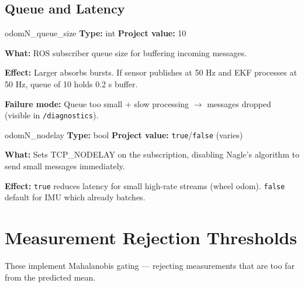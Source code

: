 \documentclass[11pt,a4paper]{article}
\begin{document}
\subsection{Queue and Latency}

\begin{paramcard}{odomN\_queue\_size}
\textbf{Type:} int \quad \textbf{Project value:} 10

\textbf{What:} ROS subscriber queue size for buffering incoming messages.

\textbf{Effect:} Larger absorbs bursts. If sensor publishes at 50 Hz and EKF processes at 50 Hz, queue of 10 holds 0.2 s buffer.

\textbf{Failure mode:} Queue too small + slow processing $\to$ messages dropped (visible in \texttt{/diagnostics}).
\end{paramcard}

\begin{paramcard}{odomN\_nodelay}
\textbf{Type:} bool \quad \textbf{Project value:} \texttt{true}/\texttt{false} (varies)

\textbf{What:} Sets TCP\_NODELAY on the subscription, disabling Nagle's algorithm to send small messages immediately.

\textbf{Effect:} \texttt{true} reduces latency for small high-rate streams (wheel odom). \texttt{false} default for IMU which already batches.
\end{paramcard}

\section{Measurement Rejection Thresholds}

These implement Mahalanobis gating --- rejecting measurements that are too far from the predicted mean.
\end{document}

